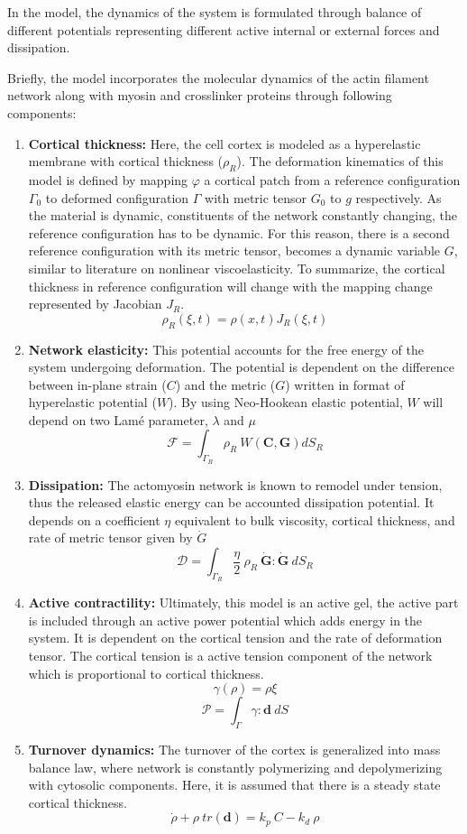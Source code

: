 In the model, the dynamics of the system is formulated through balance
of different potentials representing different active internal or
external forces and dissipation.

Briefly, the model incorporates the molecular dynamics of the actin
filament network along with myosin and crosslinker proteins through
following components:

\begin{enumerate}
\def\labelenumi{\arabic{enumi}.}
\item
  \textbf{Cortical thickness:} Here, the cell cortex is modeled as a
  hyperelastic membrane with cortical thickness (\(\rho_R\)). The
  deformation kinematics of this model is defined by mapping \(\varphi\)
  a cortical patch from a reference configuration \(\Gamma_0\) to
  deformed configuration \(\Gamma\) with metric tensor \(G_0\) to \(g\)
  respectively. As the material is dynamic, constituents of the network
  constantly changing, the reference configuration has to be dynamic.
  For this reason, there is a second reference configuration with its
  metric tensor, becomes a dynamic variable \(G\), similar to literature
  on nonlinear viscoelasticity. To summarize, the cortical thickness in
  reference configuration will change with the mapping change
  represented by Jacobian \(J_R\).
  \[ \rho_R(\xi, t) = \rho(x,t)J_R(\xi,t) \]
\item
  \textbf{Network elasticity:} This potential accounts for the free
  energy of the system undergoing deformation. The potential is
  dependent on the difference between in-plane strain (\(C\)) and the
  metric (\(G\)) written in format of hyperelastic potential (\(W\)). By
  using Neo-Hookean elastic potential, \(W\) will depend on two Lamé
  parameter, \(\lambda\) and \(\mu\)
  \[\mathcal{F} = \int_{\Gamma_R} \rho_R \ W(\mathbf{C,G})dS_R\]
\item
  \textbf{Dissipation:} The actomyosin network is known to remodel under
  tension, thus the released elastic energy can be accounted dissipation
  potential. It depends on a coefficient \(\eta\) equivalent to bulk
  viscosity, cortical thickness, and rate of metric tensor given by
  \(\dot{G}\)
  \[\mathcal{D} = \int_{\Gamma_R} \frac{\eta}{2}\ \rho_R \ \mathbf{\dot{G}}:\mathbf{\dot{G}} \ dS_R \]
\item
  \textbf{Active contractility:} Ultimately, this model is an active
  gel, the active part is included through an active power potential
  which adds energy in the system. It is dependent on the cortical
  tension and the rate of deformation tensor. The cortical tension is a
  active tension component of the network which is proportional to
  cortical thickness. \[ \gamma(\rho) =  \rho \xi\]
  \[ \mathcal{P} =  \int_{\Gamma} \gamma : \mathbf{d}  \ dS\]
\item \textbf{Turnover dynamics:} The turnover of the cortex is generalized
  into mass balance law, where network is constantly polymerizing and
  depolymerizing with cytosolic components. Here, it is assumed that
  there is a steady state cortical thickness.
  \[ \dot{\rho} + \rho \ tr(\mathbf{d}) = k_p\ C - k_d\ \rho \]
\end{enumerate}

